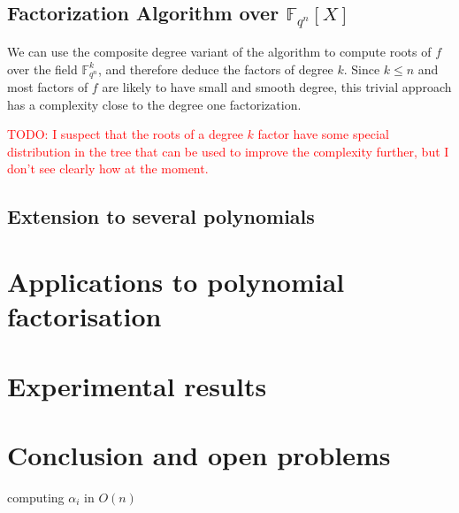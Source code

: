 \documentclass{sig-alternate}
\newcommand{\ff}[1]{\mathbb{F}_{#1}}
\newcommand{\fqn}{\ff{q^n}}
\newcommand{\qq}{q}
\newcommand{\nn}{n}
\newcommand{\qn}{{\qq^\nn}}
\newcommand{\extf}{\ff{\qn}}
\newcounter{algo}
\newcommand{\todo}[1]{\textcolor{red}{TODO: #1}}
\begin{document}
\subsection{Factorization Algorithm over $\extf[X]$}

We can use the composite degree variant of the algorithm to compute roots of $f$ over the field $\fqn^k$, and therefore deduce the factors of degree $k$. Since $k\leq n$ and most factors of $f$ are likely to have small and smooth degree, this trivial approach has a complexity close to the degree one factorization.

\todo{I suspect that the roots of a degree $k$ factor have some special distribution in the tree that can be used to improve the complexity further, but I don't see clearly how at the moment.}


\subsection{Extension to several polynomials}



\section{Applications to polynomial factorisation}
\label{sec:factorization}

\section{Experimental results}

\section{Conclusion and open problems}

computing $\alpha_i$ in $O(n)$




\end{document}
